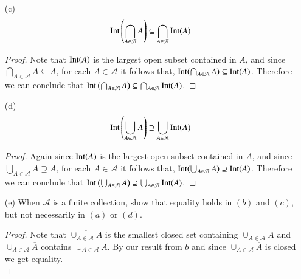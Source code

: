 \documentclass[minion]{homework651}
\begin{document}
\begin{problems}
\begin{enumerate}
    \begin{proof} Let $x \in \bigcup_{A \in \mathcal{A}}\overline{A}$. Note that $x \in \overline{A}$ for some $A \in \mathcal{A}$.
        Note that $\overline{A}$ is the smallest closed set, which contains $A$, and $\overline{\bigcup_{A \in \mathcal{A}}A}$ is the smallest closed 
        subset which contains $\bigcup_{A \in \mathcal{A}}A$, and since $A \subset \bigcup_{A \in \mathcal{A}}A$ it must follow that that $x \in \overline{A} \subseteq \overline{\bigcup_{A \in \mathcal{A}}A}$.
    \end{proof}

    \item[(c)] \begin{equation*}
        \text{Int}\left(\bigcap_{A \in \mathcal{A}}A\right) \subseteq \bigcap_{A \in \mathcal{A}}\text{Int}(A) 
    \end{equation*}
    \begin{proof}
        Note that $\text{Int}(A)$ is the largest open subset contained in $A$, and since $\bigcap_{A \in \mathcal{A}}A \subseteq A$, for each $A \in \mathcal{A}$ it follows that,
        $\text{Int}(\bigcap_{A \in \mathcal{A}}A) \subseteq \text{Int}(A)$. Therefore we can conclude that $ \text{Int}\left(\bigcap_{A \in \mathcal{A}}A\right) \subseteq \bigcap_{A \in \mathcal{A}}\text{Int}(A)$.
    \end{proof}

    \item[(d)] \begin{equation*}
        \text{Int}\left(\bigcup_{A \in \mathcal{A}}A\right) \supseteq \bigcup_{A \in \mathcal{A}}\text{Int}(A) 
    \end{equation*}
    \begin{proof}
       Again since $\text{Int}(A)$ is the largest open subset contained in $A$, and since $\bigcup_{A \in \mathcal{A}}A \supseteq A$, for each $A \in \mathcal{A}$ it follows that,
       $\text{Int}(\bigcup_{A \in \mathcal{A}}A) \supseteq \text{Int}(A)$. Therefore we can conclude that $\text{Int}\left(\bigcup_{A \in \mathcal{A}}A\right) \supseteq \bigcup_{A \in \mathcal{A}}\text{Int}(A) $.
    \end{proof}

    \item[(e)] When $\mathcal{A}$ is a finite collection, show that equality holds in $(b)$ and $(c)$, but not 
    necessarily in $(a)$ or $(d)$.
    \begin{proof} Note that $\overline{\cup_{A \in \mathcal{A}}A}$ is the smallest closed set containing $\cup_{A \in \mathcal{A}}A$ and 
        $\cup_{A \in \mathcal{A}}\overline{A}$ contains $\cup_{A \in \mathcal{A}}A$. By our result from $b$ and since $\cup_{A \in \mathcal{A}}\overline{A}$ is closed we get equality. \\



\end{proof}
\end{enumerate}
\end{problems}
\end{document}
